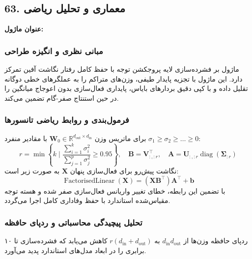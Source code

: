 \subsection*{63. معماری و تحلیل ریاضی }
\textbf{عنوان ماژول:} 

\subsubsection*{مبانی نظری و انگیزه طراحی}
ماژول  بر فشرده‌سازی لایه پروجکشن توجه با حفظ کامل رفتار نگاشت آفین تمرکز دارد. این ماژول با تجزیه پایدار طیفی، وزن‌های متراکم را به عملگرهای خطی دوگانه تقلیل داده و با کپی دقیق بردارهای بایاس، پایداری فعال‌سازی بدون اعوجاج میانگین را در حین استنتاج صفر-گام تضمین می‌کند.

\subsubsection*{فرمول‌بندی و روابط ریاضی تانسورها}
برای ماتریس وزن $\mathbf{W}_0 \in \mathbb{R}^{d_{\text{out}} \times d_{\text{in}}}$ با مقادیر منفرد $\sigma_1 \ge \sigma_2 \ge \dots \ge 0$:
\begin{equation}
r = \min \left\{ k \;\Big|\; \frac{\sum_{i=1}^k \sigma_i^2}{\sum_{j=1}^p \sigma_j^2} \ge 0.95 \right\}, \quad \mathbf{B} = \mathbf{V}_{:, :r}^\top, \quad \mathbf{A} = \mathbf{U}_{:, :r} \operatorname{diag}(\mathbf{\Sigma}_{:r})
\end{equation}
نگاشت پیش‌رو برای فعال‌سازی پنهان $\mathbf{X}$ به صورت زیر است:
\begin{equation}
\operatorname{FactorisedLinear}(\mathbf{X}) = (\mathbf{X} \mathbf{B}^\top) \mathbf{A}^\top + \mathbf{b}
\end{equation}
با تضمین این رابطه، خطای تغییر واریانس فعال‌سازی صفر شده و هسته توجه مقیاس‌شده استاندارد با حفظ وفاداری کامل اجرا می‌گردد.

\subsubsection*{تحلیل پیچیدگی محاسباتی و ردپای حافظه}
ردپای حافظه وزن‌ها از $d_{\text{in}} d_{\text{out}}$ به $r(d_{\text{in}} + d_{\text{out}})$ کاهش می‌یابد که فشرده‌سازی تا ۱۰ برابری را در ابعاد مدل‌های استاندارد پدید می‌آورد.



